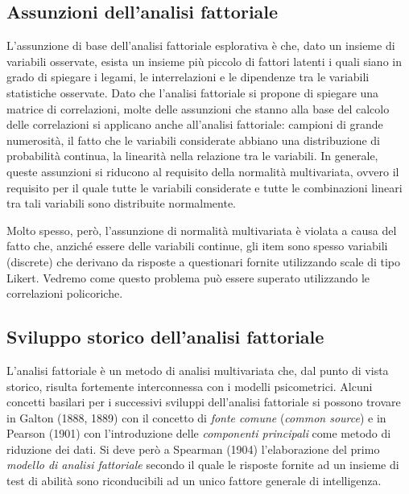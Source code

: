 \subsection{Assunzioni dell'analisi fattoriale}

L'assunzione di base dell'analisi fattoriale esplorativa è che, dato un insieme di variabili osservate, esista un insieme più piccolo di fattori latenti i quali siano in grado di spiegare i legami, le interrelazioni e le dipendenze tra le variabili statistiche osservate. Dato che l'analisi fattoriale si propone di spiegare una matrice di correlazioni, molte delle assunzioni che stanno alla base del calcolo delle correlazioni si applicano anche all'analisi fattoriale: campioni di grande numerosità, il fatto che le variabili considerate abbiano una distribuzione di probabilità continua, la linearità nella relazione tra le variabili. In generale, queste assunzioni si riducono al requisito della normalità multivariata, ovvero il requisito per il quale tutte le variabili considerate e tutte le combinazioni lineari tra tali variabili sono distribuite normalmente.

Molto spesso, però, l'assunzione di normalità multivariata è violata a causa del fatto che, anziché essere delle variabili continue, gli item sono spesso variabili (discrete) che derivano da risposte a questionari fornite utilizzando scale di tipo Likert. 
Vedremo come questo problema può essere superato utilizzando le correlazioni policoriche. 

\subsection{Sviluppo storico dell'analisi fattoriale}

L'analisi fattoriale è un metodo di analisi multivariata che, dal punto di vista storico, risulta fortemente interconnessa con i modelli psicometrici. Alcuni concetti basilari per i successivi sviluppi dell'analisi fattoriale si possono trovare in Galton (1888, 1889) con il concetto di \textit{fonte comune} (\emph{common source}) e in Pearson (1901) con l'introduzione delle \textit{componenti principali} come metodo di riduzione dei dati.
 Si deve però a Spearman (1904) l'elaborazione del primo \textit{modello di analisi fattoriale} secondo il quale le risposte fornite ad un insieme di test di abilità sono riconducibili ad un unico fattore generale di intelligenza.
 
